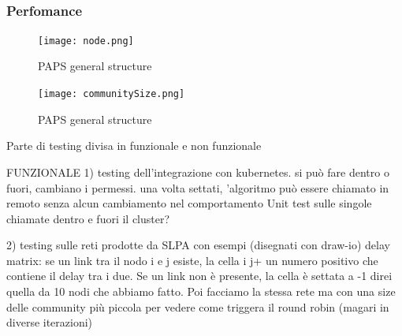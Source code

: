 \begin{figure}[]
    \centering
    \\
\end{figure}






\subsubsection*{Perfomance}




\begin{figure}[]
    \texttt{[image: node.png]}
    \label{fig:plotCommunity}
    \caption{PAPS general structure}
\end{figure}

\begin{figure}[]
    \texttt{[image: communitySize.png]}
    \label{fig:plotSize}
    \caption{PAPS general structure}
\end{figure}



Parte di testing divisa in funzionale e non funzionale

FUNZIONALE
1) testing dell'integrazione con kubernetes.
    si può fare dentro o fuori, cambiano i permessi.
    una volta settati, 'algoritmo può essere chiamato in remoto senza alcun cambiamento nel comportamento
    Unit test sulle singole chiamate dentro e fuori il cluster?

2) testing sulle reti prodotte da SLPA con esempi (disegnati con draw-io)
    delay matrix: se un link tra il nodo i e j esiste, la cella i j+ un numero positivo che contiene il delay tra i
    due. Se un link non è presente, la cella è settata a -1 
    direi quella da 10 nodi che abbiamo fatto. Poi facciamo la stessa rete ma con una size delle 
    community più piccola per vedere come triggera il round robin (magari in diverse iterazioni)

